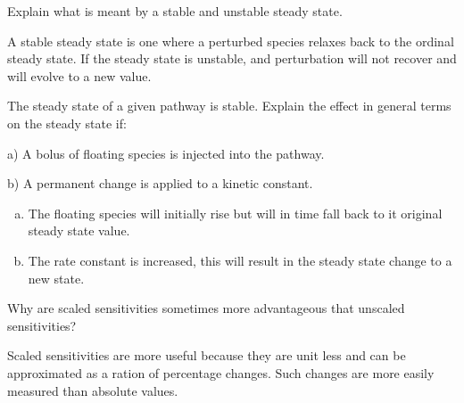 \documentclass[12pt]{article}
\begin{document}
\begin{question}
Explain what is meant by a stable and unstable steady state.
\end{question}
\begin{solution}
A stable steady state is one where a perturbed species relaxes back to the ordinal steady state. If the steady state is unstable, and perturbation will not recover and will evolve to a new value.
\end{solution}




\begin{question}
The steady state of a given pathway is stable. Explain the effect in general terms on the steady state if:

a) A bolus of floating species is injected into the pathway.

b) A permanent change is applied to a kinetic constant.
\end{question}
\begin{solution}
\begin{enumerate}[a)]
\item The floating species will initially rise but will in time fall back to it original steady state value.
\item The rate constant is increased, this will result in the steady state change to a new state.
\end{enumerate}
\end{solution}


\begin{question}
Why are scaled sensitivities sometimes more advantageous that unscaled sensitivities?
\end{question}
\begin{solution}
Scaled sensitivities are more useful because they are unit less and can be approximated as a ration of percentage changes. Such changes are more easily measured than absolute values.
\end{solution}
\end{document}
